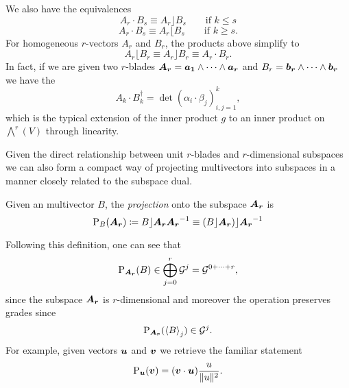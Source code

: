 We also have the equivalences
\begin{equation}
\label{eq:left_contraction_dot}
A_r \cdot B_s \equiv A_r \rfloor B_s \qquad \textrm{if $k\leq s$}
\end{equation}
\begin{equation}
\label{eq:right_contraction_dot}
A_r \cdot B_s \equiv A_r \lfloor B_s \qquad \textrm{if $k\geq s$}.
\end{equation}
For homogeneous $r$-vectors $A_r$ and $B_r$, the products above simplify to 
\begin{equation}
\label{dot_equivalent_contraction}
    A_r \lfloor B_r \equiv A_r \rfloor B_r \equiv A_r \cdot B_r.
\end{equation}
In fact, if we are given two $r$-blades $\blade{A_r} = \blade{a_1} \wedge \cdots \wedge \blade{a_r}$ and $B_r = \blade{b_r} \wedge \cdots \wedge \blade{b_r}$ we have the 
\begin{equation}
\label{eq:dot_product}
A_k \cdot B_k^\dagger = \det(\alpha_i \cdot \beta_j )_{i,j=1}^k,
\end{equation}
which is the typical extension of the inner product $g$ to an inner product on $\bigwedge^r (V)$ through linearity.

Given the direct relationship between unit $r$-blades and $r$-dimensional subspaces we can also form a compact way of projecting multivectors into subspaces in a manner closely related to the subspace dual.  \begin{definition}
Given an multivector $B$, the \emph{projection} onto the subspace $\blade{A_r}$ is
\begin{equation}
\label{eq:projection}
\projection_{B}(\blade{A_r}) \coloneqq B\rfloor \blade{A_r} \blade{A_r}^{-1} \equiv (B\rfloor \blade{A_r})\rfloor \blade{A_r}^{-1}
\end{equation}
\end{definition}
Following this definition, one can see that
\begin{equation}
\projection_{\blade{A_r}}(B) \in \bigoplus_{j=0}^r \G^j = \G^{0+\cdots + r},
\end{equation}
since the subspace $\blade{A_r}$ is $r$-dimensional and moreover the operation preserves grades since
\begin{equation}
\projection_{\blade{A_r}}(\proj{j}{B}) \in \G^j.
\end{equation}
For example, given vectors $\blade{u}$ and $\blade{v}$ we retrieve the familiar statement 
\begin{equation}
\projection_{\blade{u}} (\blade{v}) = (\blade{v} \cdot \blade{u}) \frac{u}{\|u\|^2}.
\end{equation}

